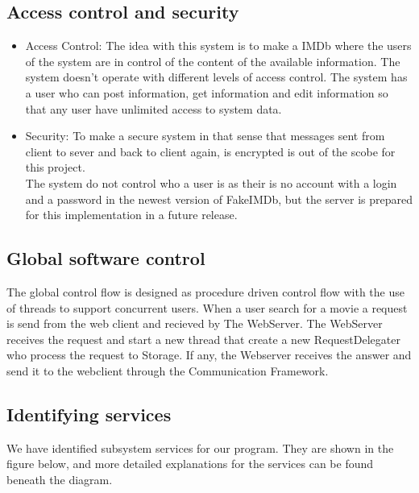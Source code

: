 \subsection{Access control and security}
\begin{itemize}
\item Access Control: The idea with this system is to make a IMDb where the users of the system are in control of the content of the available information. The system doesn't operate with different levels of access control. The system has a user who can post information, get information and edit information so that any user have unlimited access to system data.
\item Security: To make a secure system in that sense that messages sent from client to sever and back to client again, is encrypted is out of the scobe for this project.\\
The system do not control who a user is as their is no account with a login and a password in the newest version of FakeIMDb, but the server is prepared for this implementation in a future release.
\end{itemize}

\subsection{Global software control}
The global control flow is designed as procedure driven control flow with the use of threads to support concurrent users. When a user search for a movie a request is send from the web client and recieved by The WebServer. The WebServer receives the request and start a new thread that create a new RequestDelegater who process the request to Storage. If any, the Webserver receives the answer and send it to the webclient through the Communication Framework.

\subsection{Identifying services}
We have identified subsystem services for our program. They are shown in the figure below, and more detailed explanations for the services can be found beneath the diagram.

